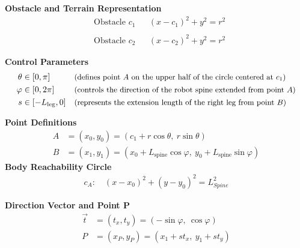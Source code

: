 \documentclass[11pt]{article}
\begin{document}
\noindent\textbf{Obstacle and Terrain Representation}
\begin{align*}
    &\text{Obstacle } c_1&& (x - c_1)^2 + y^2 = r^2 \\\\
    &\text{Obstacle } c_2&& (x - c_2)^2 + y^2 = r^2
\end{align*}


\vspace{1em}
\noindent\textbf{Control Parameters}
\begin{align*}
    \theta &\in [0, \pi] 
    && \text{\small (defines point $A$ on the upper half of the circle centered at $c_1$)} \\ 
    \varphi &\in [0, 2\pi] 
    && \text{\small (controls the direction of the robot spine extended from point $A$)} \\ 
    s &\in [-L_{\text{leg}}, 0]
    && \text{\small (represents the extension length of the right leg from point $B$)}
\end{align*}

\vspace{1em}
\noindent\textbf{Point Definitions}
\begin{align*}
    A &= (x_0, y_0) = \left(c_1 + r \cos \theta,\ r \sin \theta\right) \\
    B &= (x_1, y_1) = \left(x_0 + L_{\text{spine}} \cos \varphi,\ y_0 + L_{\text{spine}} \sin \varphi\right)
\end{align*}
\vspace{1em}
\noindent\textbf{Body Reachability Circle}
\begin{align*}
    c_A: \quad (x - x_0)^2 + (y - y_0)^2 = L_{Spine}^2
\end{align*}

\vspace{1em}
\noindent\textbf{Direction Vector and Point P}
\begin{align*}
    \vec{t} &= (t_x, t_y) = (-\sin \varphi,\ \cos \varphi) \\
    P &= (x_P, y_P) = (x_1 + s t_x,\ y_1 + s t_y)
\end{align*}
\end{document}
